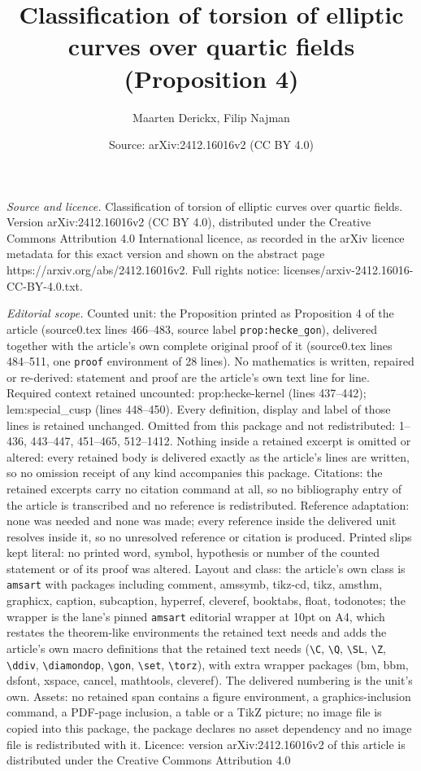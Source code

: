 \documentclass[10pt,a4paper]{amsart}
\title[Classification of torsion of elliptic curves over quartic fi]{Classification of torsion of elliptic curves over quartic fields (Proposition 4)}
\author{Maarten Derickx, Filip Najman}
\date{Source: arXiv:2412.16016v2 (CC BY 4.0)}
\begin{document}
\maketitle

\noindent\emph{Source and licence.} Classification of torsion of elliptic curves over quartic fields. Version arXiv:2412.16016v2 (CC BY 4.0), distributed under the Creative Commons Attribution 4.0 International licence, as recorded in the arXiv licence metadata for this exact version and shown on the abstract page https://arxiv.org/abs/2412.16016v2. Full rights notice: licenses/arxiv-2412.16016-CC-BY-4.0.txt.\par\smallskip

\noindent\textit{Editorial scope.} Counted unit: the Proposition printed as Proposition 4 of the article (source0.tex lines 466--483, source label \texttt{prop:hecke\_gon}), delivered together with the article's own complete original proof of it (source0.tex lines 484--511, one \texttt{proof} environment of 28 lines). No mathematics is written, repaired or re-derived: statement and proof are the article's own text line for line. Required context retained uncounted: prop:hecke-kernel (lines 437--442); lem:special\_cusp (lines 448--450). Every definition, display and label of those lines is retained unchanged. Omitted from this package and not redistributed: 1--436, 443--447, 451--465, 512--1412. Nothing inside a retained excerpt is omitted or altered: every retained body is delivered exactly as the article's lines are written, so no omission receipt of any kind accompanies this package. Citations: the retained excerpts carry no citation command at all, so no bibliography entry of the article is transcribed and no reference is redistributed. Reference adaptation: none was needed and none was made; every reference inside the delivered unit resolves inside it, so no unresolved reference or citation is produced. Printed slips kept literal: no printed word, symbol, hypothesis or number of the counted statement or of its proof was altered. Layout and class: the article's own class is \texttt{amsart} with packages including comment, amssymb, tikz-cd, tikz, amsthm, graphicx, caption, subcaption, hyperref, cleveref, booktabs, float, todonotes; the wrapper is the lane's pinned \texttt{amsart} editorial wrapper at 10pt on A4, which restates the theorem-like environments the retained text needs and adds the article's own macro definitions that the retained text needs (\texttt{\textbackslash C}, \texttt{\textbackslash Q}, \texttt{\textbackslash SL}, \texttt{\textbackslash Z}, \texttt{\textbackslash ddiv}, \texttt{\textbackslash diamondop}, \texttt{\textbackslash gon}, \texttt{\textbackslash set}, \texttt{\textbackslash torz}), with extra wrapper packages (bm, bbm, dsfont, xspace, cancel, mathtools, cleveref). The delivered numbering is the unit's own. Assets: no retained span contains a figure environment, a graphics-inclusion command, a PDF-page inclusion, a table or a TikZ picture; no image file is copied into this package, the package declares no asset dependency and no image file is redistributed with it. Licence: version arXiv:2412.16016v2 of this article is distributed under the Creative Commons Attribution 4.0 
\end{document}

